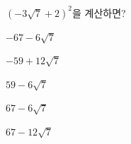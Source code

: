 $(-3\sqrt{7}+2)^2$을 계산하면?
\begin{choices32}{\rule[-3ex]{0pt}{8ex}$-67-6\sqrt{7}$}{\rule[-3ex]{0pt}{8ex}$-59+12\sqrt{7}$}{\rule[-3ex]{0pt}{8ex}$59-6\sqrt{7}$}{\rule[-3ex]{0pt}{8ex}$67-6\sqrt{7}$}{\rule[-3ex]{0pt}{8ex}$67-12\sqrt{7}$}\end{choices32}
